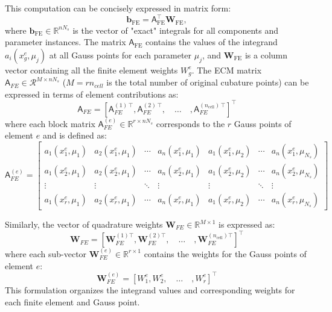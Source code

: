\documentclass[11pt]{article}
\renewcommand{\vec}[1]{\mathbf{#1}}
\newcommand{\mat}[1]{\mathsf{#1}}
\begin{document}
This computation can be concisely expressed in matrix form:
\begin{equation}
\mathbf{b}_{\text{FE}} = \mat{A}_{\text{FE}}^\top \mathbf{W}_{\text{FE}},
\end{equation}
where \(\mathbf{b}_{\text{FE}} \in \mathbb{R}^{nN_s}\) is the vector of "exact" integrals for all components and parameter instances.
The matrix \(\mat{A}_{\text{FE}}\) contains the values of the integrand \(a_i(x_g^e, \mu_j)\) at all Gauss points for each parameter \(\mu_j\), and \(\mathbf{W}_{\text{FE}}\) is a column vector containing all the finite element weights \(W_g^e\).
The ECM matrix $\mat{A}_{FE}\in\mathcal{R}^{M\times n N_s}$ ($M = r n_{cell}$ is the total number of original cubature points) can be expressed in terms of element contributions as:
\begin{equation}
\mat{A}_{FE} = \left[ 
\mat{A}_{FE}^{(1)\,\top}, 
\mat{A}_{FE}^{(2)\,\top},\quad
\hdots\quad
,\mat{A}_{FE}^{(n_{\text{cell}})\,\top} 
\right]^\top
\end{equation}
where each block matrix \(\mat{A}_{FE}^{(e)} \in \mathbb{R}^{r \times nN_s}\) corresponds to the \(r\) Gauss points of element \(e\) and is defined as:
\begin{equation}
\mat{A}_{FE}^{(e)} = 
\begin{bmatrix} 
a_1(x_1^e, \mu_1) & a_2(x_1^e, \mu_1) & \cdots & a_n(x_1^e, \mu_1) & a_1(x_1^e, \mu_2) & \cdots & a_n(x_1^e, \mu_{N_s})\\ 
a_1(x_2^e, \mu_1) & a_2(x_2^e, \mu_1) & \cdots & a_n(x_2^e, \mu_1) & a_1(x_2^e, \mu_2) & \cdots & a_n(x_2^e, \mu_{N_s})\\ 
\vdots & \vdots & \ddots & \vdots & \vdots & \ddots & \vdots \\ 
a_1(x_r^e, \mu_1) & a_2(x_r^e, \mu_1) & \cdots & a_n(x_r^e, \mu_1) & a_1(x_r^e, \mu_2)  & \cdots & a_n(x_r^e, \mu_{N_s}) 
\end{bmatrix}
\end{equation}


Similarly, the vector of quadrature weights \(\mathbf{W}_{FE} \in \mathbb{R}^{M \times 1}\) is expressed as:
\begin{equation}
\mathbf{W}_{FE} = \left[\vec{W}_{FE}^{(1)\top},
\vec{W}_{FE}^{(2)\top},\quad
\hdots\quad
,\vec{W}_{FE}^{(n_{\text{cell}})\top}\right]^\top
\label{eq:gaussian_weights}
\end{equation}
where each sub-vector \(\vec{W}_{FE}^{(e)} \in \mathbb{R}^{r \times 1}\) contains the weights for the Gauss points of element \(e\):
\begin{equation}
\vec{W}_{FE}^{(e)} = \left[ W_1^e, W_2^e, \quad\hdots\quad, W_r^e \right]^\top
\end{equation}
This formulation organizes the integrand values and corresponding weights for each finite element and Gauss point.
\end{document}
